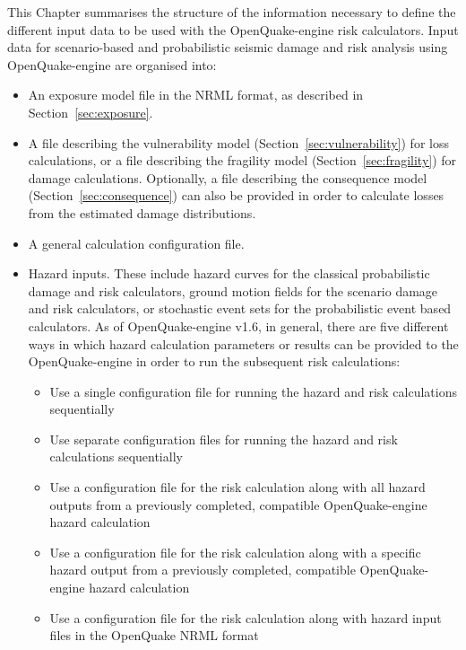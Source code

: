 This Chapter summarises the structure of the information necessary to define
the different input data to be used with the OpenQuake-engine risk
calculators. Input data for scenario-based and probabilistic seismic damage
and risk analysis using OpenQuake-engine are organised into:

\begin{itemize}

  \item An exposure model file in the NRML format, as described in 
    Section~\ref{sec:exposure}.

  \item A file describing the \gls{vulnerability model}
    (Section~\ref{sec:vulnerability}) for loss calculations, or a 
  	file describing the \gls{fragility model} (Section~\ref{sec:fragility})
    for damage calculations. Optionally, a file describing the
    \gls{consequence model} (Section~\ref{sec:consequence}) can also be
  	provided in order to calculate losses from the estimated damage
  	distributions.

  \item A general calculation configuration file.

  \item Hazard inputs. These include hazard curves for the classical
    probabilistic damage and risk calculators, ground motion fields for the
    scenario damage and risk calculators, or stochastic event sets for the
    probabilistic event based calculators. As of OpenQuake-engine v1.6, in
    general, there are five different ways in which hazard calculation
    parameters or results can be provided to the OpenQuake-engine in order to
    run the subsequent risk calculations:

    \begin{itemize}

      \item Use a single configuration file for running the hazard and risk
      calculations sequentially

      \item Use separate configuration files for running the hazard and risk
      calculations sequentially

      \item Use a configuration file for the risk calculation along with all
      hazard outputs from a previously completed, compatible
      OpenQuake-engine hazard calculation

      \item Use a configuration file for the risk calculation along with a
      specific hazard output from a previously completed, compatible
      OpenQuake-engine hazard calculation

      \item Use a configuration file for the risk calculation along with
      hazard input files in the OpenQuake NRML format

    \end{itemize}

\end{itemize}

